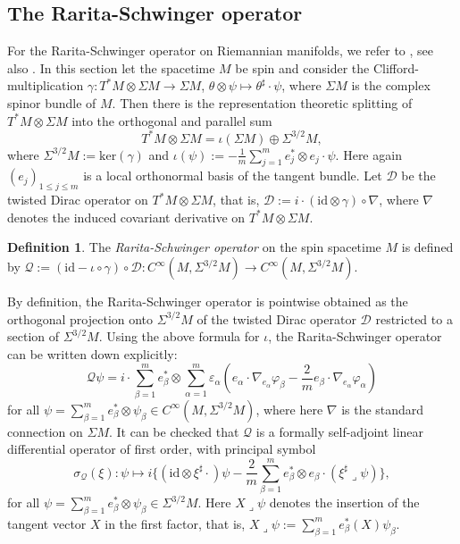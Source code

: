 \documentclass[a4paper,11pt]{amsart}
\theoremstyle{definition}
\newtheorem{definition}[thm]{Definition}
\begin{document}
\subsection{The Rarita-Schwinger operator}\label{ss:RaritaSchwinger}

For the Rarita-Schwinger operator on Riemannian manifolds, we refer to \cite[Sec.~2]{Wang}, see also \cite[Sec.~2]{BransonHijaziBW}.
In this section let the spacetime $M$ be spin and consider the Clifford-multiplication $\gamma:T^*M\otimes\Sigma M\rightarrow \Sigma M$, $\theta\otimes\psi\mapsto \theta^\sharp\cdot\psi$, where $\Sigma M$ is the complex spinor bundle of $M$.
Then there is the representation theoretic splitting of $T^*M\otimes\Sigma M$ into the orthogonal and parallel sum
\[
T^*M\otimes\Sigma M=\iota(\Sigma M)\oplus {\Sigma^{3/2}M},
\]
where ${\Sigma^{3/2}M}:=\mathrm{ker}(\gamma)$ and $\iota(\psi):=-\frac{1}{m}\sum_{j=1}^me_j^*\otimes e_j\cdot\psi$.
Here again $(e_j)_{1\leq j\leq m}$ is a local orthonormal basis of the tangent bundle.
Let $\mathcal{D}$ be the twisted Dirac operator on $T^*M\otimes\Sigma M$, that is, $\mathcal{D}:=i\cdot({\mathrm{id}}\otimes\gamma)\circ\nabla$,
where $\nabla$ denotes the induced covariant derivative on $T^*M\otimes\Sigma M$.

\begin{definition}
The \emph{Rarita-Schwinger operator} on the spin spacetime $M$ is defined by ${\mathcal{Q}}:=({\mathrm{id}}-\iota\circ\gamma)\circ\mathcal{D}:{C^\infty}(M,{\Sigma^{3/2}M})\rightarrow{C^\infty}(M,{\Sigma^{3/2}M})$.
\end{definition}

By definition, the Rarita-Schwinger operator is pointwise obtained as the orthogonal projection onto ${\Sigma^{3/2}M}$ of the twisted Dirac operator $\mathcal{D}$ restricted to a section of ${\Sigma^{3/2}M}$. 
Using the above formula for $\iota$, the Rarita-Schwinger operator can be written down explicitly:
\[
{\mathcal{Q}}\psi
=
i\cdot\sum_{\beta=1}^me_\beta^*\otimes \sum_{\alpha=1}^m{\varepsilon}_\alpha(e_\alpha\cdot\nabla_{e_\alpha}{\varphi}_\beta-\frac{2}{m}e_\beta\cdot\nabla_{e_\alpha}{\varphi}_\alpha)
\]
for all $\psi=\sum_{\beta=1}^me_\beta^*\otimes\psi_\beta\in{C^\infty}(M,{\Sigma^{3/2}M})$, where here $\nabla$ is the standard connection on $\Sigma M$.
It can be checked that ${\mathcal{Q}}$ is a formally self-adjoint linear differential operator of first order, with principal symbol
\[
\sigma_{\mathcal{Q}}(\xi):\psi\mapsto i\Big\{({\mathrm{id}}\otimes\xi^\sharp\cdot)\psi-\frac{2}{m}\sum_{\beta=1}^me_\beta^*\otimes e_\beta\cdot(\xi^\sharp\lrcorner\psi)\Big\},
\]
for all $\psi=\sum_{\beta=1}^me_\beta^*\otimes\psi_\beta\in {\Sigma^{3/2}M}$.
Here $X\lrcorner\psi$ denotes the insertion of the tangent vector $X$ in the first factor, that is, $X\lrcorner\psi:=\sum_{\beta=1}^me_\beta^*(X)\psi_\beta$.\\
\end{document}

